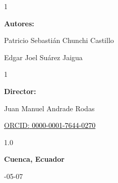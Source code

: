 \begin{titlepage}
\vspace*{0.4cm}

\begin{spacing}{1}
{\fontsize{11}{14}\selectfont \textbf{Autores:}\par}
{\fontsize{11}{14}\selectfont Patricio Sebastián Chunchi Castillo\par}
{\fontsize{11}{14}\selectfont Edgar Joel Suárez Jaigua\par}
\end{spacing}

\vspace*{0.9cm}

\begin{spacing}{1}
    
{\fontsize{11}{14}\selectfont \textbf{Director:}\par}
{\fontsize{11}{14}\selectfont Juan Manuel Andrade Rodas\par}
{\fontsize{11}{14}\selectfont \href{https://orcid.org/0000-0001-7644-0270}{\textcolor{orcidlogocol}{ORCID:} \textcolor{black}{0000-0001-7644-0270}}\par}

\end{spacing}

\vfill

\begin{center}
\begin{spacing}{1.0}
    {\fontsize{11}{14}\selectfont \textbf{Cuenca, Ecuador}\par}
    \vspace*{2mm}
    {\fontsize{11}{14}-05-07\par}
\end{spacing}
\end{center}

\end{titlepage}
\clearpage